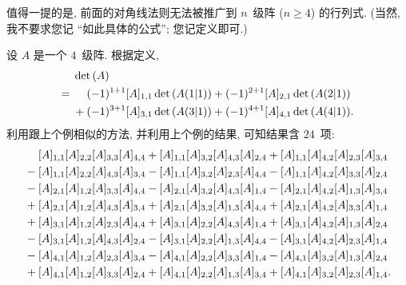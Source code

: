 值得一提的是,
前面的对角线法则无法被推广到
\(n\)~级阵 (\(n \geq 4\)) 的行列式.
(当然, 我不要求您记 ``如此具体的公式'';
您记定义即可.)

\begin{example}
    设 \(A\) 是一个 \(4\)~级阵.
    根据定义,
    \begin{align*}
             & \det {(A)}
        \\
        = {} &
        \hphantom{{} + {}}
        (-1)^{1+1} [A]_{1,1} \det {(A(1|1))}
        + (-1)^{2+1} [A]_{2,1} \det {(A(2|1))}
        \\
             &
        + (-1)^{3+1} [A]_{3,1} \det {(A(3|1))}
        + (-1)^{4+1} [A]_{4,1} \det {(A(4|1))}.
    \end{align*}
    利用跟上个例相似的方法, 并利用上个例的结果,
    可知结果含 \(24\)~项:
    \begin{align*}
         & \hphantom{{} + {}}
        [A]_{1,1} [A]_{2,2} [A]_{3,3} [A]_{4,4}
        + [A]_{1,1} [A]_{3,2} [A]_{4,3} [A]_{2,4}
        + [A]_{1,1} [A]_{4,2} [A]_{2,3} [A]_{3,4}
        \\
         &
        - [A]_{1,1} [A]_{2,2} [A]_{4,3} [A]_{3,4}
        - [A]_{1,1} [A]_{3,2} [A]_{2,3} [A]_{4,4}
        - [A]_{1,1} [A]_{4,2} [A]_{3,3} [A]_{2,4}
        \\
         &
        - [A]_{2,1} [A]_{1,2} [A]_{3,3} [A]_{4,4}
        - [A]_{2,1} [A]_{3,2} [A]_{4,3} [A]_{1,4}
        - [A]_{2,1} [A]_{4,2} [A]_{1,3} [A]_{3,4}
        \\
         &
        + [A]_{2,1} [A]_{1,2} [A]_{4,3} [A]_{3,4}
        + [A]_{2,1} [A]_{3,2} [A]_{1,3} [A]_{4,4}
        + [A]_{2,1} [A]_{4,2} [A]_{3,3} [A]_{1,4}
        \\
         &
        + [A]_{3,1} [A]_{1,2} [A]_{2,3} [A]_{4,4}
        + [A]_{3,1} [A]_{2,2} [A]_{4,3} [A]_{1,4}
        + [A]_{3,1} [A]_{4,2} [A]_{1,3} [A]_{2,4}
        \\
         &
        - [A]_{3,1} [A]_{1,2} [A]_{4,3} [A]_{2,4}
        - [A]_{3,1} [A]_{2,2} [A]_{1,3} [A]_{4,4}
        - [A]_{3,1} [A]_{4,2} [A]_{2,3} [A]_{1,4}
        \\
         &
        - [A]_{4,1} [A]_{1,2} [A]_{2,3} [A]_{3,4}
        - [A]_{4,1} [A]_{2,2} [A]_{3,3} [A]_{1,4}
        - [A]_{4,1} [A]_{3,2} [A]_{1,3} [A]_{2,4}
        \\
         &
        + [A]_{4,1} [A]_{1,2} [A]_{3,3} [A]_{2,4}
        + [A]_{4,1} [A]_{2,2} [A]_{1,3} [A]_{3,4}
        + [A]_{4,1} [A]_{3,2} [A]_{2,3} [A]_{1,4}.
    \end{align*}

\end{example}
